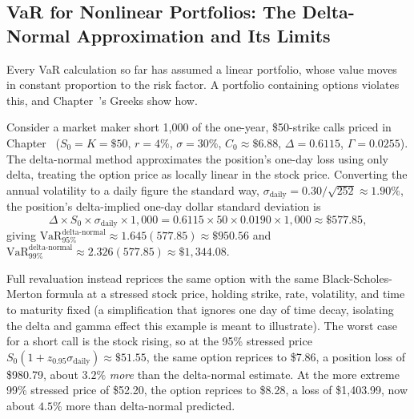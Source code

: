 \documentclass[../ai_in_finance]{subfiles}
\begin{document}
\subsection{VaR for Nonlinear Portfolios: The Delta-Normal Approximation and Its Limits}
\label{sec:delta-normal}

Every VaR calculation so far has assumed a linear portfolio, whose value moves in constant proportion to the risk factor. A portfolio containing options violates this, and Chapter~'s Greeks show how.

Consider a market maker short 1,000 of the one-year, \$50-strike calls priced in Chapter~ ($S_0=K=\$50$, $r=4\%$, $\sigma=30\%$, $C_0\approx\$6.88$, $\Delta=0.6115$, $\Gamma=0.0255$). The delta-normal method approximates the position's one-day loss using only delta, treating the option price as locally linear in the stock price.
Converting the annual volatility to a daily figure the standard way, $\sigma_{\text{daily}} = 0.30/\sqrt{252} \approx 1.90\%$, the position's delta-implied one-day dollar standard deviation is
\begin{equation*}
\Delta \times S_0 \times \sigma_{\text{daily}} \times 1{,}000 = 0.6115 \times 50 \times 0.0190 \times 1{,}000 \approx \$577.85,
\end{equation*}
giving $\text{VaR}_{95\%}^{\text{delta-normal}} \approx 1.645(577.85) \approx \$950.56$ and $\text{VaR}_{99\%}^{\text{delta-normal}} \approx 2.326(577.85) \approx \$1{,}344.08$.

Full revaluation instead reprices the same option with the same Black-Scholes-Merton formula at a stressed stock price, holding strike, rate, volatility, and time to maturity fixed (a simplification that ignores one day of time decay, isolating the delta and gamma effect this example is meant to illustrate).
The worst case for a short call is the stock rising, so at the 95\% stressed price $S_0(1+z_{0.95}\sigma_{\text{daily}}) \approx \$51.55$, the same option reprices to \$7.86, a position loss of \$980.79, about $3.2\%$ \emph{more} than the delta-normal estimate. At the more extreme 99\% stressed price of \$52.20, the option reprices to \$8.28, a loss of \$1,403.99, now about $4.5\%$ more than delta-normal predicted.
\end{document}
